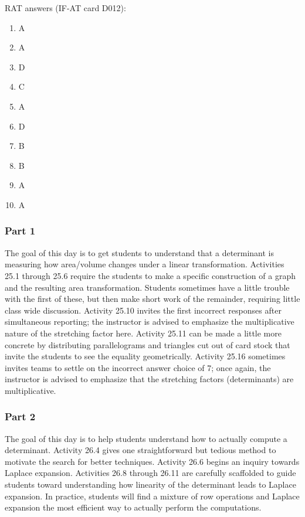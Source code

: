 \documentclass{article}
\begin{document}
RAT answers (IF-AT card D012):
\begin{multicols}{10}
\begin{enumerate}[1)]
\item A
\item A
\item D
\item C
\item A
\item D
\item B
\item B
\item A
\item A
\end{enumerate}
\end{multicols}

\subsubsection*{Part 1}
The goal of this day is to get students to understand that a determinant is measuring how area/volume changes under a linear transformation.  Activities 25.1 through 25.6 require the students to make a specific construction of a graph and the resulting area transformation.  Students sometimes have a little trouble with the first of these, but then make short work of the remainder, requiring little class wide discussion.  Activity 25.10 invites the first incorrect responses after simultaneous reporting; the instructor is advised to emphasize the multiplicative nature of the stretching factor here.  Activity 25.11 can be made a little more concrete by distributing parallelograms and triangles cut out of card stock that invite the students to see the equality geometrically.  Activity 25.16 sometimes invites teams to settle on the incorrect answer choice of 7; once again, the instructor is advised to emphasize that the stretching factors (determinants) are multiplicative.

\subsubsection*{Part 2}
The goal of this day is to help students understand how to actually compute a determinant.  Activity 26.4 gives one straightforward but tedious method to motivate the search for better techniques.  Activity 26.6 begins an inquiry towards Laplace expansion.  Activities 26.8 through 26.11 are carefully scaffolded to guide students toward understanding how linearity of the determinant leads to Laplace expansion.  In practice, students will find a mixture of row operations and Laplace expansion the most efficient way to actually perform the computations.
\end{document}
